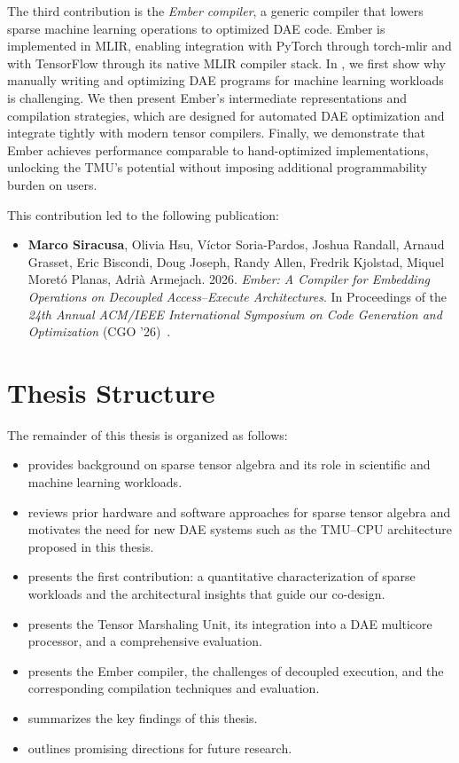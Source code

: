 The third contribution is the \emph{Ember compiler}, a generic compiler that lowers sparse machine learning operations to optimized DAE code. Ember is implemented in MLIR, enabling integration with PyTorch through torch-mlir and with TensorFlow through its native MLIR compiler stack. In , we first show why manually writing and optimizing DAE programs for machine learning workloads is challenging. We then present Ember’s intermediate representations and compilation strategies, which are designed for automated DAE optimization and integrate tightly with modern tensor compilers. Finally, we demonstrate that Ember achieves performance comparable to hand-optimized implementations, unlocking the TMU’s potential without imposing additional programmability burden on users.

This contribution led to the following publication:
\begin{itemize}
    \item \textbf{Marco Siracusa}, Olivia Hsu, Víctor Soria-Pardos, Joshua Randall, Arnaud Grasset, Eric Biscondi, Doug Joseph, Randy Allen, Fredrik Kjolstad, Miquel Moretó Planas, Adrià Armejach. 2026. \textit{Ember: A Compiler for Embedding Operations on Decoupled Access--Execute Architectures}. In Proceedings of the \textit{24th Annual ACM/IEEE International Symposium on Code Generation and Optimization} (CGO '26)~\cite{siracusa2026cgo}.
\end{itemize}

\section{Thesis Structure} \label{sec:introduction-structure}

The remainder of this thesis is organized as follows:
\begin{itemize}
\item {} provides background on sparse tensor algebra and its role in scientific and machine learning workloads.
\item {} reviews prior hardware and software approaches for sparse tensor algebra and motivates the need for new DAE systems such as the TMU--CPU architecture proposed in this thesis.
\item {} presents the first contribution: a quantitative characterization of sparse workloads and the architectural insights that guide our co-design.
\item {} presents the Tensor Marshaling Unit, its integration into a DAE multicore processor, and a comprehensive evaluation.
\item {} presents the Ember compiler, the challenges of decoupled execution, and the corresponding compilation techniques and evaluation.
\item {} summarizes the key findings of this thesis.
\item {} outlines promising directions for future research.
\end{itemize}
